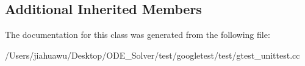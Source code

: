 \subsection*{Additional Inherited Members}


The documentation for this class was generated from the following file\+:\begin{DoxyCompactItemize}
\item 
/\+Users/jiahuawu/\+Desktop/\+O\+D\+E\+\_\+\+Solver/test/googletest/test/gtest\+\_\+unittest.\+cc\end{DoxyCompactItemize}

